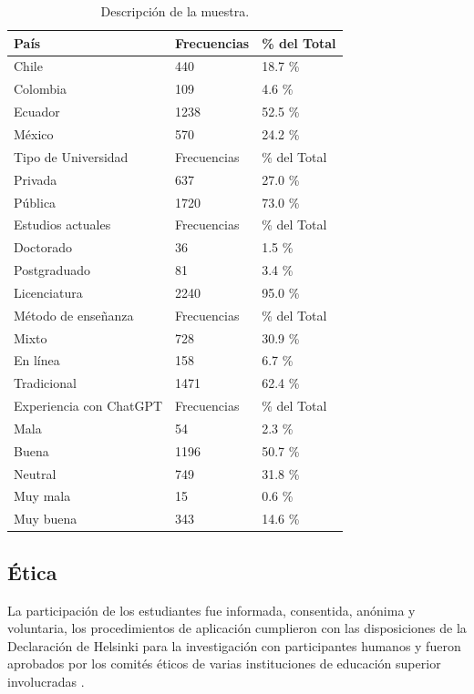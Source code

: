 \documentclass[spanish]{textolivre}
\begin{document}
\begin{table}[h!]
\centering
\begin{threeparttable}
\caption{Descripción de la muestra.}\label{tab-1}
\begin{tabular}{p{4cm} p{2cm} p{2cm}}
\toprule
País & Frecuencias & \% del Total \\
\midrule
Chile & 440 & 18.7 \% \\
Colombia & 109 & 4.6 \% \\
Ecuador & 1238 & 52.5 \% \\
México & 570 & 24.2 \% \\
\addlinespace
Tipo de Universidad & Frecuencias & \% del Total \\
Privada & 637 & 27.0 \% \\
Pública & 1720 & 73.0 \% \\
\addlinespace
Estudios actuales & Frecuencias & \% del Total \\
Doctorado & 36 & 1.5 \% \\
Postgraduado & 81 & 3.4 \% \\
Licenciatura & 2240 & 95.0 \% \\
\addlinespace
Método de enseñanza & Frecuencias & \% del Total \\
Mixto & 728 & 30.9 \% \\
En línea & 158 & 6.7 \% \\
Tradicional & 1471 & 62.4 \% \\
\addlinespace
Experiencia con ChatGPT & Frecuencias & \% del Total \\
Mala & 54 & 2.3 \% \\
Buena & 1196 & 50.7 \% \\
Neutral & 749 & 31.8 \% \\
Muy mala & 15 & 0.6 \% \\
Muy buena & 343 & 14.6 \% \\
\bottomrule
\end{tabular}
\end{threeparttable}
\end{table}

\subsection{Ética}
La participación de los estudiantes fue informada, consentida, anónima y voluntaria, los procedimientos de aplicación cumplieron con las disposiciones de la Declaración de Helsinki para la investigación con participantes humanos \cite{worldmedicalassociation2024} y fueron aprobados por los comités éticos de varias instituciones de educación superior involucradas \cite{covid19socialsciencelab2024}.
\end{document}
